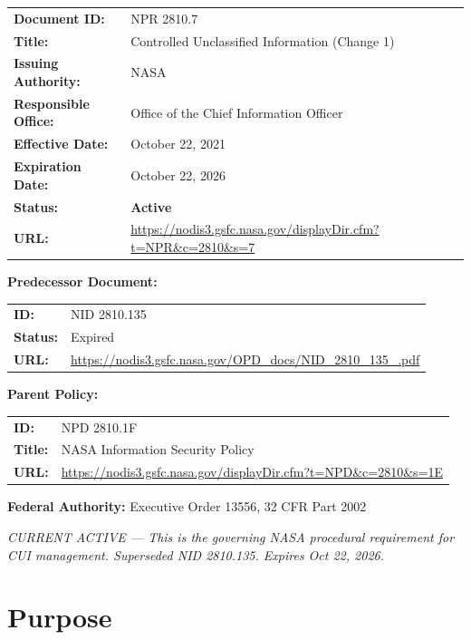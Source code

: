 \documentclass[11pt,letterpaper]{article}
\begin{document}
\begin{tabular}{@{}ll@{}}
\textbf{Document ID:} & NPR 2810.7 \\
\textbf{Title:} & Controlled Unclassified Information (Change 1) \\
\textbf{Issuing Authority:} & NASA \\
\textbf{Responsible Office:} & Office of the Chief Information Officer \\
\textbf{Effective Date:} & October 22, 2021 \\
\textbf{Expiration Date:} & October 22, 2026 \\
\textbf{Status:} & \textbf{Active} \\
\textbf{URL:} & \url{https://nodis3.gsfc.nasa.gov/displayDir.cfm?t=NPR&c=2810&s=7} \\
\end{tabular}

\vspace{8pt}
\textbf{Predecessor Document:}
\begin{tabular}{@{}ll@{}}
\textbf{ID:} & NID 2810.135 \\
\textbf{Status:} & Expired \\
\textbf{URL:} & \url{https://nodis3.gsfc.nasa.gov/OPD_docs/NID_2810_135_.pdf} \\
\end{tabular}

\vspace{8pt}
\textbf{Parent Policy:}
\begin{tabular}{@{}ll@{}}
\textbf{ID:} & NPD 2810.1F \\
\textbf{Title:} & NASA Information Security Policy \\
\textbf{URL:} & \url{https://nodis3.gsfc.nasa.gov/displayDir.cfm?t=NPD&c=2810&s=1E} \\
\end{tabular}

\vspace{8pt}
\textbf{Federal Authority:} Executive Order 13556, 32 CFR Part 2002

\vspace{8pt}
\textit{CURRENT ACTIVE --- This is the governing NASA procedural requirement for CUI management. Superseded NID 2810.135. Expires Oct 22, 2026.}

\section{Purpose}
\end{document}
